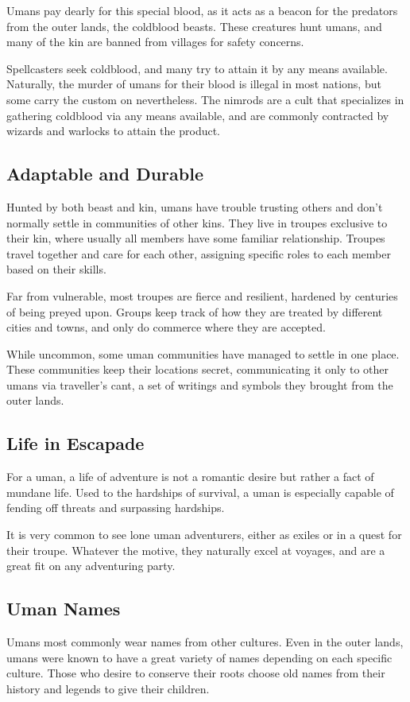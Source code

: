 \begin{linenumbers}
Umans pay dearly for this special blood, as it acts as a beacon for the predators from the outer lands, the coldblood beasts.
These creatures hunt umans, and many of the kin are banned from villages for safety concerns.

Spellcasters seek coldblood, and many try to attain it by any means available.
Naturally, the murder of umans for their blood is illegal in most nations, but some carry the custom on nevertheless.
The nimrods are a cult that specializes in gathering coldblood via any means available, and are commonly contracted by wizards and warlocks to attain the product.

\subsection*{Adaptable and Durable}
Hunted by both beast and kin, umans have trouble trusting others and don't normally settle in communities of other kins.
They live in troupes exclusive to their kin, where usually all members have some familiar relationship.
Troupes travel together and care for each other, assigning specific roles to each member based on their skills.

Far from vulnerable, most troupes are fierce and resilient, hardened by centuries of being preyed upon.
Groups keep track of how they are treated by different cities and towns, and only do commerce where they are accepted.

While uncommon, some uman communities have managed to settle in one place.
These communities keep their locations secret, communicating it only to other umans via traveller's cant, a set of writings and symbols they brought from the outer lands.

\subsection*{Life in Escapade}
For a uman, a life of adventure is not a romantic desire but rather a fact of mundane life.
Used to the hardships of survival, a uman is especially capable of fending off threats and surpassing hardships.

It is very common to see lone uman adventurers, either as exiles or in a quest for their troupe.
Whatever the motive, they naturally excel at voyages, and are a great fit on any adventuring party.

\subsection*{Uman Names}
Umans most commonly wear names from other cultures.
Even in the outer lands, umans were known to have a great variety of names depending on each specific culture.
Those who desire to conserve their roots choose old names from their history and legends to give their children.


\end{linenumbers}
